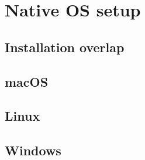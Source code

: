 
\section{Native OS setup} %
\label{sec:native_os_setup}

\subsection{Installation overlap} %
\label{sec:installation_overlap}




\subsection{macOS} %
\label{sec:macos}


\subsection{Linux} %
\label{sec:linux}


\subsection{Windows} %
\label{sec:windows}



